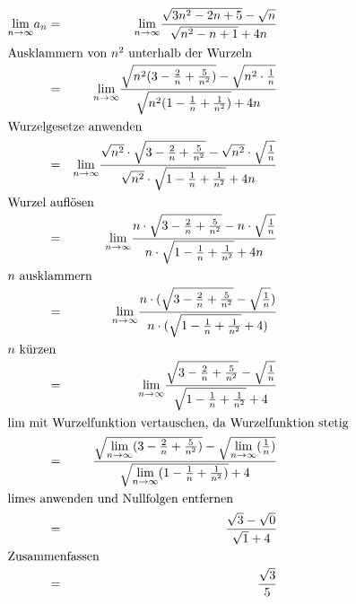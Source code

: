 \documentclass[10pt,a4paper,oneside,ngerman,numbers=noenddot]{scrartcl}
\begin{document}
\subsection{} %
\begin{alignat*}{2}
\underset{n \rightarrow \infty}{\text{lim}} a_{n} &=& \underset{n \rightarrow \infty}{\text{lim}} \frac{\sqrt{3n^{2}-2n+5}-\sqrt{n}}{\sqrt{n^{2}-n+1}+4n} \\
\intertext{Ausklammern von $n^{2}$ unterhalb der Wurzeln}
&=& \underset{n \rightarrow \infty}{\text{lim}} \frac{\sqrt{n^{2} (3 - \frac{2}{n} + \frac{5}{n^{2}})} - \sqrt{n^{2} \cdot \frac{1}{n}}}{\sqrt{n^{2} (1 -\frac{1}{n} + \frac{1}{n^{2}})} + 4n} \\
\intertext{Wurzelgesetze anwenden}
&=& \underset{n \rightarrow \infty}{\text{lim}} \frac{\sqrt{n^{2}} \cdot \sqrt{3 - \frac{2}{n} + \frac{5}{n^{2}}} - \sqrt{n^{2}} \cdot \sqrt{\frac{1}{n}}}{\sqrt{n^{2}} \cdot \sqrt{1 -\frac{1}{n} + \frac{1}{n^{2}}} + 4n} \\
\intertext{Wurzel auflösen}
&=& \underset{n \rightarrow \infty}{\text{lim}} \frac{n \cdot \sqrt{3 - \frac{2}{n} + \frac{5}{n^{2}}} - n \cdot \sqrt{\frac{1}{n}}}{n \cdot \sqrt{1 -\frac{1}{n} + \frac{1}{n^{2}}} + 4n} \\
\intertext{$n$ ausklammern}
&=& \underset{n \rightarrow \infty}{\text{lim}} \frac{n \cdot (\sqrt{3 - \frac{2}{n} + \frac{5}{n^{2}}} - \sqrt{\frac{1}{n}})}{n \cdot (\sqrt{1 -\frac{1}{n} + \frac{1}{n^{2}}} + 4)} \\
\intertext{$n$ kürzen}
&=& \underset{n \rightarrow \infty}{\text{lim}} \frac{\sqrt{3 - \frac{2}{n} + \frac{5}{n^{2}}} - \sqrt{\frac{1}{n}}}{\sqrt{1 -\frac{1}{n} + \frac{1}{n^{2}}} + 4} \\
\intertext{lim mit Wurzelfunktion vertauschen, da Wurzelfunktion stetig}
&=& \frac{\sqrt{\underset{n \rightarrow \infty}{\text{lim}} (3 - \frac{2}{n} + \frac{5}{n^{2}})} - \sqrt{\underset{n \rightarrow \infty}{\text{lim}}(\frac{1}{n})}}{\sqrt{\underset{n \rightarrow \infty}{\text{lim}} (1 -\frac{1}{n} + \frac{1}{n^{2}})} + 4} \\
\intertext{limes anwenden und Nullfolgen entfernen}
&=& \frac{\sqrt{3} - \sqrt{0}}{\sqrt{1} + 4} \\
\intertext{Zusammenfassen}
&=& \frac{\sqrt{3}}{5}
\end{alignat*}
\end{document}
